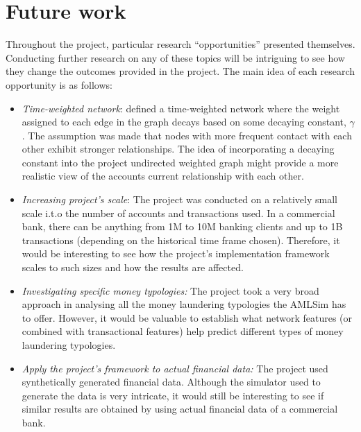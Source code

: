 \section{Future work}

Throughout the project, particular research ``opportunities'' presented themselves. Conducting further research on any of these topics will be intriguing to see how they change the outcomes provided in the project. The main idea of each research opportunity is as follows:

\begin{itemize}
    \item \textit{Time-weighted network}: \citet{van2017gotcha} defined a time-weighted network where the weight assigned to each edge in the graph decays based on some decaying constant, $\gamma$. The assumption was made that nodes with more frequent contact with each other exhibit stronger relationships. The idea of incorporating a decaying constant into the project undirected weighted graph might provide a more realistic view of the accounts current relationship with each other. 
    
    \item \textit{Increasing project's scale}: The project was conducted on a relatively small scale i.t.o the number of accounts and transactions used. In a commercial bank, there can be anything from 1M to 10M banking clients and up to 1B transactions (depending on the historical time frame chosen). Therefore, it would be interesting to see how the project's implementation framework scales to such sizes and how the results are affected.
    
    \item \textit{Investigating specific money typologies:} The project took a very broad approach in analysing all the money laundering typologies the AMLSim has to offer. However, it would be valuable to establish what network features (or combined with transactional features) help predict different types of money laundering typologies.
    
    \item \textit{Apply the project's framework to actual financial data:} The project used synthetically generated financial data. Although the simulator used to generate the data is very intricate, it would still be interesting to see if similar results are obtained by using actual financial data of a commercial bank.    
    
\end{itemize}




